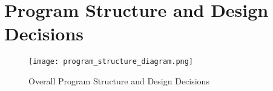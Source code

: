 \documentclass{article}
\begin{document}
\newpage
\section{Program Structure and Design Decisions}
\begin{figure}[h]
    \centering
    \texttt{[image: program\_structure\_diagram.png]}
    \caption{Overall Program Structure and Design Decisions}
    \label{fig:program_structure}
\end{figure}
\end{document}
